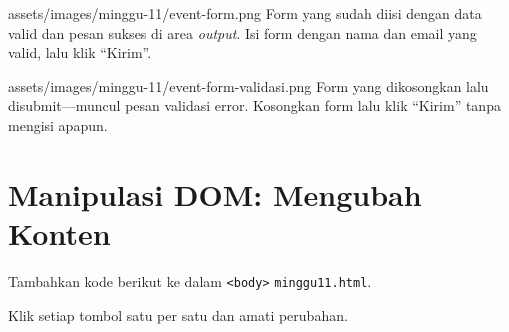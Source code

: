 \begin{tangkapanlayar}
  {assets/images/minggu-11/event-form.png}
  {Form yang sudah diisi dengan data valid dan pesan sukses di area \emph{output}.}
  {Isi form dengan nama dan email yang valid, lalu klik ``Kirim''.}
\end{tangkapanlayar}

\begin{tangkapanlayar}
  {assets/images/minggu-11/event-form-validasi.png}
  {Form yang dikosongkan lalu disubmit---muncul pesan validasi error.}
  {Kosongkan form lalu klik ``Kirim'' tanpa mengisi apapun.}
\end{tangkapanlayar}

\section{Manipulasi DOM: Mengubah Konten}
\label{sec:11-manipulasi-konten}

\begin{langkah}
  \item Tambahkan kode berikut ke dalam \texttt{<body>} \texttt{minggu11.html}.
  \item Klik setiap tombol satu per satu dan amati perubahan.
\end{langkah}

